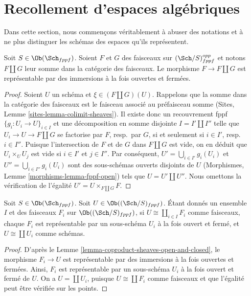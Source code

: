 \section{Recollement d'espaces algébriques}
\label{section-glueing-algebraic-spaces}

\noindent
Dans cette section, nous commençons véritablement à abuser des notations et à ne plus
distinguer les schémas des espaces qu'ils représentent.

\begin{lemma}
\label{lemma-coproduct-sheaves-open-and-closed}
Soit $S \in \Ob(\Sch_{fppf})$. Soient $F$ et $G$ des faisceaux sur
$(\Sch/S)_{fppf}^{opp}$ et notons $F \amalg G$ leur somme
dans la catégorie des faisceaux. Le morphisme $F \to F \amalg G$ est représentable par
des immersions à la fois ouvertes et fermées.
\end{lemma}

\begin{proof}
Soient $U$ un schéma et $\xi \in (F \amalg G)(U)$. Rappelons que la
somme dans la catégorie des faisceaux est le faisceau associé au
préfaisceau somme (Sites, Lemme \ref{sites-lemma-colimit-sheaves}).
Il existe donc un recouvrement fppf $\{g_i : U_i \to U\}_{i \in I}$
et une décomposition en somme disjointe $I = I' \amalg I''$ telle que
$U_i \to U \to F \amalg G$ se factorise par $F$, resp.\ par $G$,
si et seulement si $i \in I'$, resp.\ $i \in I''$. Puisque l'intersection de $F$ et de
$G$ dans $F \amalg G$ est vide, on en déduit que
$U_i \times_U U_j$ est vide si $i \in I'$ et $j \in I''$.
Par conséquent, $U' = \bigcup_{i \in I'} g_i(U_i)$ et
$U'' = \bigcup_{i \in I''} g_i(U_i)$ sont des sous-schémas ouverts
disjoints de $U$ (Morphismes, Lemme \ref{morphisms-lemma-fppf-open})
tels que $U = U' \amalg U''$.
Nous omettons la vérification de l'égalité $U' = U \times_{F \amalg G} F$.
\end{proof}

\begin{lemma}
\label{lemma-representable-sheaf-coproduct-sheaves}
Soit $S \in \Ob(\Sch_{fppf})$.
Soit $U \in \Ob((\Sch/S)_{fppf})$.
Étant donnés un ensemble $I$ et des faisceaux $F_i$ sur $\Ob((\Sch/S)_{fppf})$,
si $U \cong \coprod_{i\in I} F_i$
comme faisceaux, chaque $F_i$ est représentable par un sous-schéma
$U_i$ à la fois ouvert et fermé, et $U \cong \coprod U_i$ comme schémas.
\end{lemma}

\begin{proof}
D'après le Lemme \ref{lemma-coproduct-sheaves-open-and-closed},
le morphisme $F_i \to U$ est représentable par des immersions à la fois ouvertes et fermées.
Ainsi, $F_i$ est représentable par un sous-schéma $U_i$ à la fois ouvert et fermé de $U$.
On a $U = \coprod U_i$, puisque $U \cong \coprod F_i$
comme faisceaux et que l'égalité peut être vérifiée sur les points.
\end{proof}

